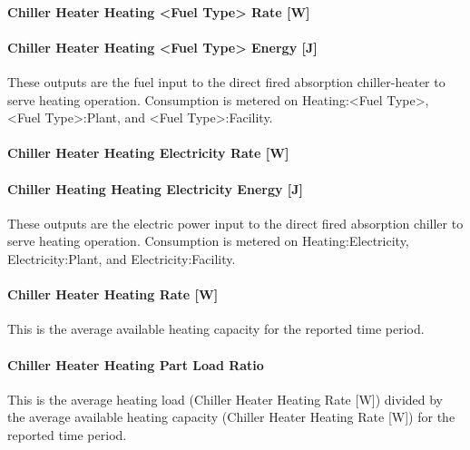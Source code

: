 \paragraph{Chiller Heater Heating \textless{}Fuel Type\textgreater{} Rate {[}W{]}}\label{chiller-heater-heating-fuel-type-rate-w}

\paragraph{Chiller Heater Heating \textless{}Fuel Type\textgreater{} Energy {[}J{]}}\label{chiller-heater-heating-fuel-type-energy-j}

These outputs are the fuel input to the direct fired absorption chiller-heater to serve heating operation. Consumption is metered on Heating:\textless{}Fuel Type\textgreater{}, \textless{}Fuel Type\textgreater{}:Plant, and \textless{}Fuel Type\textgreater{}:Facility.

\paragraph{Chiller Heater Heating Electricity Rate {[}W{]}}\label{chiller-heater-heating-electric-power-w}

\paragraph{Chiller Heating Heating Electricity Energy {[}J{]}}\label{chiller-heating-heating-electric-energy-j}

These outputs are the electric power input to the direct fired absorption chiller to serve heating operation. Consumption is metered on Heating:Electricity, Electricity:Plant, and Electricity:Facility.

\paragraph{Chiller Heater Heating Rate {[}W{]}}\label{chiller-heater-heating-rate-w-1}

This is the average available heating capacity for the reported time period.

\paragraph{Chiller Heater Heating Part Load Ratio}\label{chiller-heater-heating-part-load-ratio}

This is the average heating load (Chiller Heater Heating Rate {[}W{]}) divided by the average available heating capacity (Chiller Heater Heating Rate {[}W{]}) for the reported time period.

